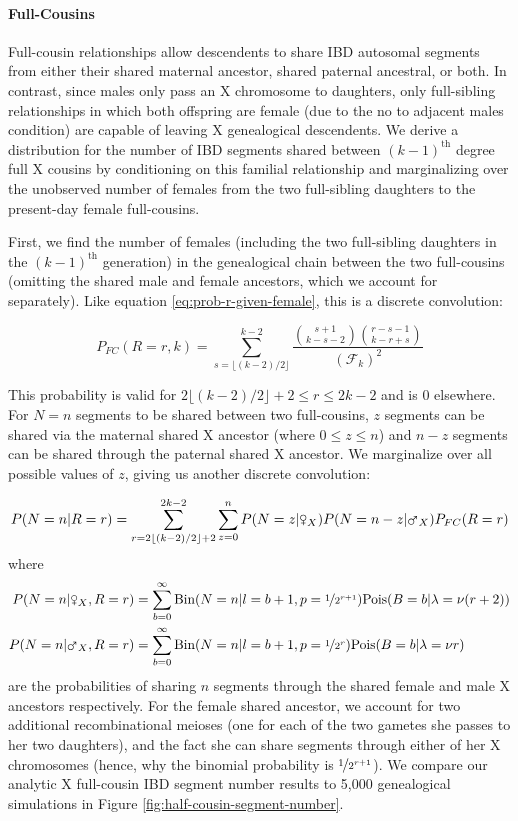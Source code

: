 \documentclass[11pt]{article}
\newcommand{\msxa}{\mars_X}
\newcommand{\fsxa}{\venus_X}
\begin{document}
\paragraph{Full-Cousins}
\label{sec:full-cousins}

Full-cousin relationships allow descendents to share IBD autosomal segments
from either their shared maternal ancestor, shared paternal ancestral, or both.
In contrast, since males only pass an X chromosome to daughters, only
full-sibling relationships in which both offspring are female (due to the no to
adjacent males condition) are capable of leaving X genealogical descendents. We
derive a distribution for the number of IBD segments shared between
$(k-1)^\text{th}$ degree full X cousins by conditioning on this familial
relationship and marginalizing over the unobserved number of females from the
two full-sibling daughters to the present-day female full-cousins.

First, we find the number of females (including the two full-sibling daughters
in the $(k-1)^\text{th}$ generation) in the genealogical chain between the two
full-cousins (omitting the shared male and female ancestors, which we account
for separately). Like equation \eqref{eq:prob-r-given-female}, this is a
discrete convolution:

\begin{equation}
  P_{FC}(R = r, k) = \sum_{s = \lfloor (k-2)/2 \rfloor}^{k-2} \frac{{s+1 \choose k-s-2 } {r-s-1 \choose k-r+s}}{(\mathcal{F}_k)^2}
\end{equation}

This probability is valid for $2\lfloor (k-2)/2 \rfloor + 2 \le r \le 2k-2$ and
is 0 elsewhere. For $N=n$ segments to be shared between two full-cousins, $z$
segments can be shared via the maternal shared X ancestor (where $0 \le z \le n$)
and $n-z$ segments can be shared through the paternal shared X ancestor. We
marginalize over all possible values of $z$, giving us another discrete
convolution:

\begin{equation}
  \label{eq:prob-n-full-sibs}
  P(N = n | R=r) = \sum_{r=2\lfloor (k-2)/2\rfloor + 2}^{2k-2} \sum_{z=0}^{n} P(N = z | \fsxa) P(N = n - z | \msxa) P_{FC}(R=r)
\end{equation}
%
where
%
\begin{align}
  P(N = n | \fsxa, R=r) &= \sum_{b=0}^\infty \text{Bin}(N=n | l = b+1, p=\nicefrac{1}{2^{r+1}}) \text{Pois}(B=b | \lambda = \nu (r+2)) \\
  P(N = n | \msxa, R=r) &= \sum_{b=0}^\infty \text{Bin}(N=n | l = b+1, p=\nicefrac{1}{2^r}) \text{Pois}(B=b | \lambda = \nu r) 
\end{align}
%
are the probabilities of sharing $n$ segments through the shared female and
male X ancestors respectively. For the female shared ancestor, we account for
two additional recombinational meioses (one for each of the two gametes she
passes to her two daughters), and the fact she can share segments through
either of her X chromosomes (hence, why the binomial probability is
$\nicefrac{1}{2^{r+1}}$). We compare our analytic X full-cousin IBD segment
number results to 5,000 genealogical simulations in Figure
\ref{fig:half-cousin-segment-number}.
\end{document}
